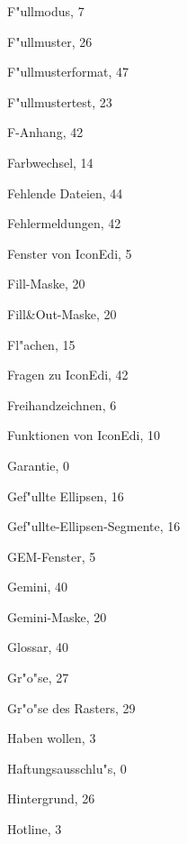 \begin{theindex}
  \indexspace

  \item F"ullmodus, 7
  \item F"ullmuster, 26
  \item F"ullmusterformat, 47
  \item F"ullmustertest, 23
  \item F-Anhang, 42
  \item Farbwechsel, 14
  \item Fehlende Dateien, 44
  \item Fehlermeldungen, 42
  \item Fenster von IconEdi, 5
  \item Fill-Maske, 20
  \item Fill\&Out-Maske, 20
  \item Fl"achen, 15
  \item Fragen zu IconEdi, 42
  \item Freihandzeichnen, 6
  \item Funktionen von IconEdi, 10

  \indexspace

  \item Garantie, 0
  \item Gef"ullte Ellipsen, 16
  \item Gef"ullte-Ellipsen-Segmente, 16
  \item GEM-Fenster, 5
  \item Gemini, 40
  \item Gemini-Maske, 20
  \item Glossar, 40
  \item Gr"o"se, 27
  \item Gr"o"se des Rasters, 29

  \indexspace

  \item Haben wollen, 3
  \item Haftungsausschlu"s, 0
  \item Hintergrund, 26
  \item Hotline, 3

  \indexspace


\end{theindex}
